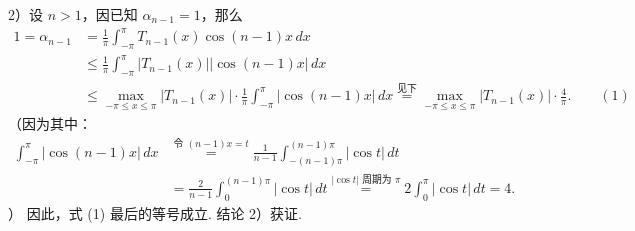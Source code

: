 \documentclass[UTF8, 12pt, fontset=fandol, oneside]{ctexart}
\providecommand{\xlongequal}[1]{\stackrel{#1}{=}}
\begin{document}
2）设 $n>1$，因已知 $\alpha_{n-1}=1$，那么
\[
\begin{aligned}
1=\alpha_{n-1}
&=\frac1\pi\int_{-\pi}^{\pi}T_{n-1}(x)\cos(n-1)x\,dx\\
&\le\frac1\pi\int_{-\pi}^{\pi}|T_{n-1}(x)||\cos(n-1)x|\,dx\\
&\le\max_{-\pi\le x\le\pi}|T_{n-1}(x)|\cdot
\frac1\pi\int_{-\pi}^{\pi}|\cos(n-1)x|\,dx
\xlongequal{\text{见下}}
\max_{-\pi\le x\le\pi}|T_{n-1}(x)|\cdot\frac4\pi. \qquad(1)
\end{aligned}
\]
（因为其中：
\[
\begin{aligned}
\int_{-\pi}^{\pi}|\cos(n-1)x|\,dx
&\xlongequal{\text{令 }(n-1)x=t}
\frac1{n-1}\int_{-(n-1)\pi}^{(n-1)\pi}|\cos t|\,dt\\
&=\frac2{n-1}\int_0^{(n-1)\pi}|\cos t|\,dt
\xlongequal{|\cos t|\text{ 周期为 }\pi}
2\int_0^{\pi}|\cos t|\,dt=4.
\end{aligned}
\]
）
因此，式 (1) 最后的等号成立. 结论 2）获证.
\end{document}
